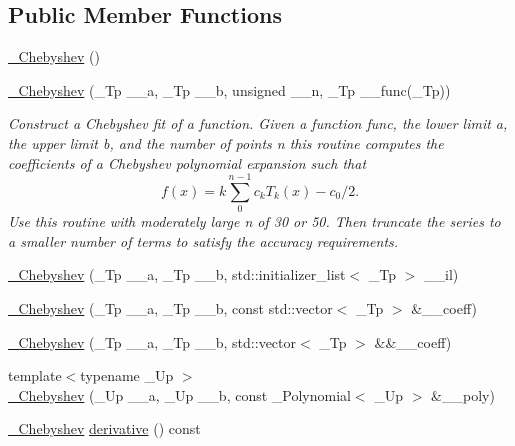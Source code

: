 \subsection*{Public Member Functions}
\begin{DoxyCompactItemize}
\item 
\hyperlink{class____gnu__cxx_1_1__Chebyshev_aa68f563831ae3f7afb2596d38e078291}{\+\_\+\+Chebyshev} ()
\item 
\hyperlink{class____gnu__cxx_1_1__Chebyshev_a7ae17adff595fd004822d7434285ad26}{\+\_\+\+Chebyshev} (\+\_\+\+Tp \+\_\+\+\_\+a, \+\_\+\+Tp \+\_\+\+\_\+b, unsigned \+\_\+\+\_\+n, \+\_\+\+Tp \+\_\+\+\_\+func(\+\_\+\+Tp))
\begin{DoxyCompactList}\small\item\em Construct a Chebyshev fit of a function. Given a function {\ttfamily func}, the lower limit {\ttfamily a}, the upper limit {\ttfamily b}, and the number of points {\ttfamily n} this routine computes the coefficients of a Chebyshev polynomial expansion such that \[ f(x) = k\sum_{0}^{n-1} c_k T_k(x) - c_0/2. \] Use this routine with moderately large n of 30 or 50. Then truncate the series to a smaller number of terms to satisfy the accuracy requirements. \end{DoxyCompactList}\item 
\hyperlink{class____gnu__cxx_1_1__Chebyshev_a3bbf8155026331ee6a644253a4142d4e}{\+\_\+\+Chebyshev} (\+\_\+\+Tp \+\_\+\+\_\+a, \+\_\+\+Tp \+\_\+\+\_\+b, std\+::initializer\+\_\+list$<$ \+\_\+\+Tp $>$ \+\_\+\+\_\+il)
\item 
\hyperlink{class____gnu__cxx_1_1__Chebyshev_a284eef7cb9971d933d19e10703d2029c}{\+\_\+\+Chebyshev} (\+\_\+\+Tp \+\_\+\+\_\+a, \+\_\+\+Tp \+\_\+\+\_\+b, const std\+::vector$<$ \+\_\+\+Tp $>$ \&\+\_\+\+\_\+coeff)
\item 
\hyperlink{class____gnu__cxx_1_1__Chebyshev_a39f37ba2a90b4fe76ee08a348cfba173}{\+\_\+\+Chebyshev} (\+\_\+\+Tp \+\_\+\+\_\+a, \+\_\+\+Tp \+\_\+\+\_\+b, std\+::vector$<$ \+\_\+\+Tp $>$ \&\&\+\_\+\+\_\+coeff)
\item 
{\footnotesize template$<$typename \+\_\+\+Up $>$ }\\\hyperlink{class____gnu__cxx_1_1__Chebyshev_abc2b50080347414895d47e02a0543a2c}{\+\_\+\+Chebyshev} (\+\_\+\+Up \+\_\+\+\_\+a, \+\_\+\+Up \+\_\+\+\_\+b, const \+\_\+\+Polynomial$<$ \+\_\+\+Up $>$ \&\+\_\+\+\_\+poly)
\item 
\hyperlink{class____gnu__cxx_1_1__Chebyshev}{\+\_\+\+Chebyshev} \hyperlink{class____gnu__cxx_1_1__Chebyshev_a690446e057539c62406212dea9d6f6c6}{derivative} () const

\end{DoxyCompactItemize}
